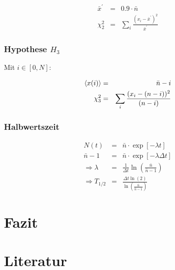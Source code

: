 \documentclass[12pt,a4paper]{scrartcl}
\numberwithin{equation}{section} %
\renewcommand{\[}{} %
\renewcommand{\]}{\noindent} %
\begin{document}
\[
\begin{eqnarray}
    \bar x^\prime &=& 0.9\cdot\bar n \\
    \chi^2_2 &=& \sum_i \frac{(x_i-\bar x^\prime)^2}{\bar x^\prime}
\end{eqnarray}
\]

\hypertarget{hypothese-h_3}{%
\subsubsection{\texorpdfstring{Hypothese
\(H_3\)}{Hypothese H\_3}}\label{hypothese-h_3}}

Mit \(i\in[0, N]\):

\[
\begin{eqnarray}
    \expval{x(i)} &=& \bar n - i \\
    \chi^2_3 &=& \sum_i \frac{(x_i-(n - i))^2}{(n - i)}
\end{eqnarray}
\]

\hypertarget{totzeit}{%
\subsubsection{Halbwertszeit}\label{totzeit}}
\begin{eqnarray}
	N(t) &=& \bar{n} \cdot \exp[-\lambda t] \\
	\bar{n}-1 &=& \bar{n} \cdot \exp[-\lambda \Delta t] \\
	\Rightarrow \lambda &=& \frac{1}{\Delta t} \ln(\frac{\bar{n}}{\bar{n}-1}) \\
	\Rightarrow T_{1/2} &=& \frac{\Delta t \ln(2)}{\ln(\frac{\bar{n}}{\bar{n}-1})}
\end{eqnarray}

\clearpage
\hypertarget{fazit}{%
\section{Fazit}\label{fazit}}

\clearpage
\hypertarget{literatur}{%
\section{Literatur}\label{literatur}}
\end{document}
